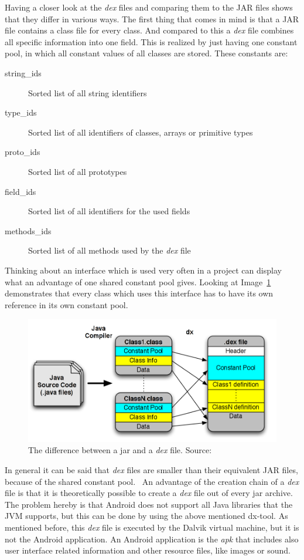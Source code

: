 Having a closer look at the \textit{dex} files and comparing them to the JAR files shows that they differ in various ways.
The first thing that comes in mind is that a JAR file contains a class file for every class.
And compared to this a \textit{dex} file combines all specific information into one field.
This is realized by just having one constant pool, in which all constant values of all classes are stored.
These constants are:
\begin{description}
  \item[string\_ids] Sorted list of all string identifiers
  \item[type\_ids] Sorted list of all identifiers of classes, arrays or primitive types
  \item[proto\_ids] Sorted list of all prototypes
  \item[field\_ids] Sorted list of all identifiers for the used fields
  \item[methods\_ids] Sorted list of all methods used by the \textit{dex} file
\end{description}
Thinking about an interface which is used very often in a project can display what an advantage of one shared constant pool gives.
Looking at Image~\ref{fig:jar-dex} demonstrates that every class which uses this interface has to have its own reference in its own constant pool.
\begin{figure}[h]
\begin{center}
\includegraphics[scale=0.41]{images/jar-dex.png} 
\caption{The difference between a jar and a \textit{dex} file. Source:~\cite{enck2011study}}
\label{fig:jar-dex}
\end{center}
\end{figure}

In general it can be said that \textit{dex} files are smaller than their equivalent JAR files, because of the shared constant pool.~\cite{bornstein2008dalvik}
An advantage of the creation chain of a \textit{dex} file is that it is theoretically possible to create a \textit{dex} file out of every jar archive.
The problem hereby is that Android does not support all Java libraries that the JVM supports, but this can be done by using the above mentioned dx-tool. 
As mentioned before, this \textit{dex} file is executed by the Dalvik virtual machine, but it is not the Android application.
An Android application is the \textit{apk} that includes also user interface related information and other resource files, like images or sound.

